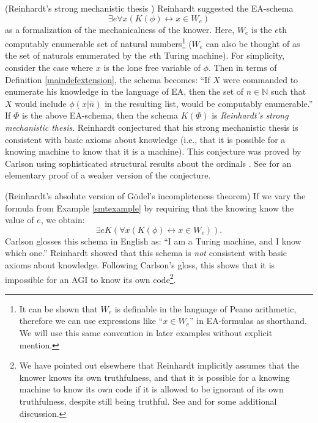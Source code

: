 \documentclass[runningheads]{llncs}
\begin{document}
\begin{example}
\label{smtexample}
    (Reinhardt's strong mechanistic thesis
    \cite{reinhardt1985absolute} \cite{reinhardt1986epistemic}
    \cite{carlson}) Reinhardt suggested the
    EA-schema
    \[\exists e \forall x ( K(\phi) \leftrightarrow x\in W_e)\]
    as a formalization of the mechanicalness of the knower. Here, $W_e$
    is the $e$th computably enumerable set of natural numbers\footnote{It can be
    shown that $W_e$ is definable in the language of Peano arithmetic, therefore we
    can use expressions like ``$x\in W_e$'' in EA-formulas as shorthand. We will
    use this same convention in later
    examples without explicit mention.} ($W_e$ can also
    be thought of as the set of naturals enumerated by the $e$th Turing machine).
    For simplicity, consider the case where $x$ is the lone free variable
    of $\phi$. Then in terms of Definition \ref{maindefextension}, the schema
    becomes:
    ``If $X$ were commanded to enumerate his knowledge in the language of EA,
    then the set of $n\in\mathbb N$ such that $X$ would include $\phi(x|\overline n)$
    in the resulting list, would be computably enumerable.''
    If $\Phi$ is the above EA-schema, then the schema $K(\Phi)$ is \emph{Reinhardt's
    strong mechanistic thesis}. Reinhardt conjectured that his strong mechanistic
    thesis is consistent with basic axioms about knowledge (i.e., that it is
    possible for a knowing machine to know that it is a machine).
    This conjecture was proved by Carlson \cite{carlson} using sophisticated
    structural results about the ordinals \cite{carlson1999}.
    See \cite{alexander2015fast} for an elementary proof of a weaker
    version of the conjecture.
\end{example}

\begin{example}
\label{reinhardtnegativeexample}
  (Reinhardt's absolute version of G\"odel's incompleteness theorem)
  If we vary the formula from Example \ref{smtexample} by requiring that the
  knowing know the value of $e$, we obtain:
  \[
    \exists e K(\forall x ( K(\phi) \leftrightarrow x\in W_e)).
  \]
  Carlson \cite{carlson} glosses this schema in English as:
  ``I am a Turing machine, and I know which one.''
  Reinhardt showed that this schema is \emph{not} consistent with basic
  axioms about knowledge. Following Carlson's gloss, this shows
  that it is impossible for an AGI to know its own code\footnote{We have
  pointed out elsewhere \cite{alexander2014machine} that Reinhardt
  implicitly assumes that the knower knows its own truthfulness, and that
  it is possible for a knowing machine to know its own code if it is allowed to
  be ignorant of its own truthfulness, despite still being truthful.
  See \cite{aldini2015self} and \cite{aldini2015theory} for some additional discussion.}.
\end{example}
\end{document}
